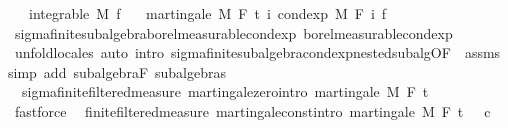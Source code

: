 \begin{isabellebody}
\ \ \ {\isachardoublequoteopen}integrable\ M\ f{\isachardoublequoteclose}\isanewline
\ \ \ {\isachardoublequoteopen}martingale\ M\ F\ t\ {\isacharparenleft}{\kern0pt}{\isasymlambda}i{\isachardot}{\kern0pt}\ cond{\isacharunderscore}{\kern0pt}exp\ M\ {\isacharparenleft}{\kern0pt}F\ i{\isacharparenright}{\kern0pt}\ f{\isacharparenright}{\kern0pt}{\isachardoublequoteclose}\isanewline
%
\isadelimproof
\ \ %
\endisadelimproof
%
\isatagproof
{}\isamarkupfalse%
\ sigma{\isacharunderscore}{\kern0pt}finite{\isacharunderscore}{\kern0pt}subalgebra{\isachardot}{\kern0pt}borel{\isacharunderscore}{\kern0pt}measurable{\isacharunderscore}{\kern0pt}cond{\isacharunderscore}{\kern0pt}exp{\isacharprime}{\kern0pt}\ borel{\isacharunderscore}{\kern0pt}measurable{\isacharunderscore}{\kern0pt}cond{\isacharunderscore}{\kern0pt}exp\ \isanewline
\ \ \isamarkupfalse%
\ {\isacharparenleft}{\kern0pt}unfold{\isacharunderscore}{\kern0pt}locales{\isacharparenright}{\kern0pt}\ {\isacharparenleft}{\kern0pt}auto\ intro{\isacharcolon}{\kern0pt}\ sigma{\isacharunderscore}{\kern0pt}finite{\isacharunderscore}{\kern0pt}subalgebra{\isachardot}{\kern0pt}cond{\isacharunderscore}{\kern0pt}exp{\isacharunderscore}{\kern0pt}nested{\isacharunderscore}{\kern0pt}subalg{\isacharbrackleft}{\kern0pt}OF\ {\isacharunderscore}{\kern0pt}\ assms{\isacharbrackright}{\kern0pt}\ simp\ add{\isacharcolon}{\kern0pt}\ subalgebra{\isacharunderscore}{\kern0pt}F\ subalgebras{\isacharparenright}{\kern0pt}%
\endisatagproof
{\isafoldproof}%
%
\isadelimproof
\isanewline
%
\endisadelimproof
\isanewline
{}\isamarkupfalse%
\ {\isacharparenleft}{\kern0pt}\ sigma{\isacharunderscore}{\kern0pt}finite{\isacharunderscore}{\kern0pt}filtered{\isacharunderscore}{\kern0pt}measure{\isacharparenright}{\kern0pt}\ martingale{\isacharunderscore}{\kern0pt}zero{\isacharbrackleft}{\kern0pt}intro{\isacharbrackright}{\kern0pt}{\isacharcolon}{\kern0pt}\ {\isachardoublequoteopen}martingale\ M\ F\ t\ {\isacharparenleft}{\kern0pt}{\isasymlambda}{\isacharunderscore}{\kern0pt}\ {\isacharunderscore}{\kern0pt}{\isachardot}{\kern0pt}\ {}{\isacharparenright}{\kern0pt}{\isachardoublequoteclose}%
\isadelimproof
\ %
\endisadelimproof
%
\isatagproof
{}\isamarkupfalse%
\ fastforce%
\endisatagproof
{\isafoldproof}%
%
\isadelimproof
%
\endisadelimproof
\isanewline
\isanewline
{}\isamarkupfalse%
\ {\isacharparenleft}{\kern0pt}\ finite{\isacharunderscore}{\kern0pt}filtered{\isacharunderscore}{\kern0pt}measure{\isacharparenright}{\kern0pt}\ martingale{\isacharunderscore}{\kern0pt}const{\isacharbrackleft}{\kern0pt}intro{\isacharbrackright}{\kern0pt}{\isacharcolon}{\kern0pt}\ {\isachardoublequoteopen}martingale\ M\ F\ t\ {\isacharparenleft}{\kern0pt}{\isasymlambda}{\isacharunderscore}{\kern0pt}\ {\isacharunderscore}{\kern0pt}{\isachardot}{\kern0pt}\ c{\isacharparenright}{\kern0pt}{\isachardoublequoteclose}%

\end{isabellebody}
